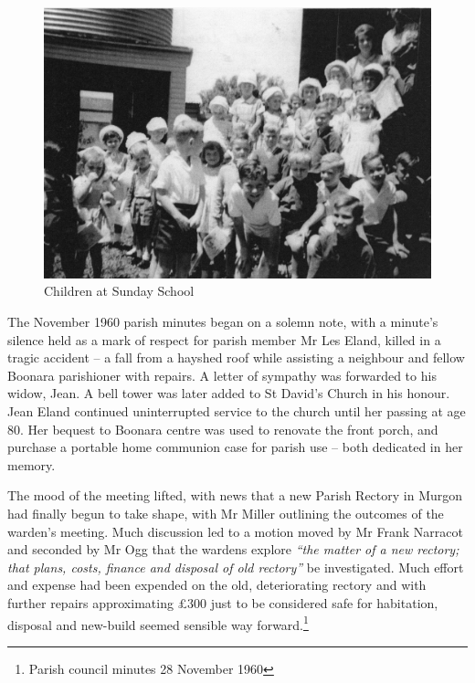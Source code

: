\begin{figure}[!htb]
\begin{center}
\includegraphics[width=1.\textwidth,center]{../images/sundaySchoolChildren.jpg}
\caption{Children at Sunday School}
\end{center}
\end{figure}




The November 1960 parish minutes began on a solemn note, with a minute's silence held as a mark of respect for parish member Mr Les Eland, killed in a tragic accident -- a fall from a hayshed roof while assisting a neighbour and fellow Boonara parishioner with repairs. A letter of sympathy was forwarded to his widow, Jean. A bell tower was later added to St David's Church in his honour. Jean Eland continued uninterrupted service to the church until her passing at age 80. Her bequest to Boonara centre was used to renovate the front porch, and purchase a portable home communion case for parish use -- both dedicated in her memory.



The mood of the meeting lifted, with news that a new Parish Rectory in Murgon had finally begun to take shape, with Mr Miller outlining the outcomes of the warden's meeting. Much discussion led to a motion moved by Mr Frank Narracot and seconded by Mr Ogg that the wardens explore \emph{``the matter of a new rectory; that plans, costs, finance and disposal of old rectory''} be investigated. Much effort and expense had been expended on the old, deteriorating rectory and with further repairs approximating \pounds300 just to be considered safe for habitation, disposal and new-build seemed sensible way forward.\footnote{Parish council minutes 28 November 1960}



